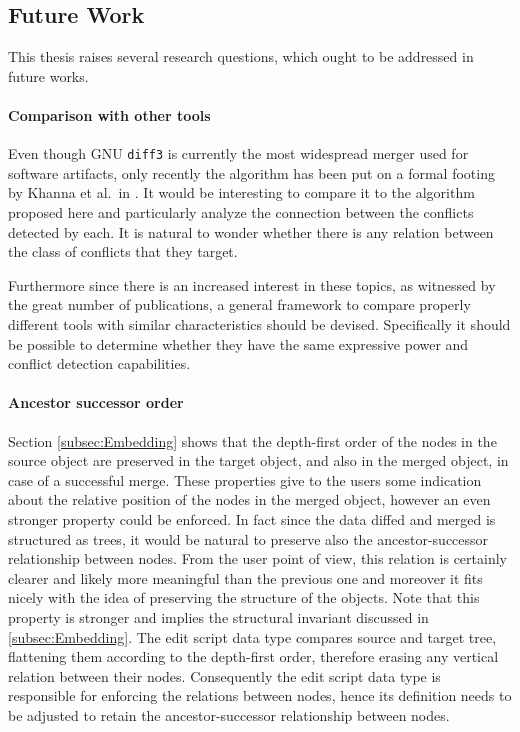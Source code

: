 \documentclass[../Thesis.tex]{subfiles}
\begin{document}
	
	\subsection{Future Work}	
	This thesis raises several research questions, which ought to be 
	addressed in future works.
	
	\paragraph{Comparison with other tools}
	Even though GNU \texttt{diff3} is currently the most widespread merger 
	used for software artifacts, only recently the algorithm has been put on a 
	formal footing by Khanna et al.\ in \cite{PierceDiff3}.
	It would be interesting to compare it to the algorithm proposed here
	and particularly analyze the connection between the conflicts detected
	by each. It is natural to wonder whether there is any relation between
	the class of conflicts that they target. 
	
	Furthermore since there is an increased interest in these topics, as 
	witnessed by the great number of publications, a general framework
	to compare properly different tools with similar characteristics 
	should be devised. Specifically it should be possible 
	to determine whether they have the same expressive power and
	conflict detection capabilities.
	
	\paragraph{Ancestor successor order}		
	Section \ref{subsec:Embedding} shows that the depth-first order
	of the nodes in the source object are preserved in the target object,
	and also in the merged object, in case of a successful merge.
	These properties give to the users some indication about the relative
	position of the nodes in the merged object, however an even stronger
	property could be enforced. In fact since the data diffed and merged is 
	structured as trees, it would be natural to preserve also the 
	ancestor-successor relationship between nodes.
	From the user point of view, this relation is certainly clearer and likely 
	more meaningful than the previous one and moreover it fits nicely
	with the idea of preserving the structure of the objects.
	Note that this property is stronger and implies the structural invariant
	discussed in \ref{subsec:Embedding}.
	The edit script data type compares source and target tree, flattening
	them according to the depth-first order, therefore erasing any
	vertical relation between their nodes. 
	Consequently the edit script data type is responsible
	for enforcing the relations between nodes, hence its definition 
	needs to be	adjusted to retain the ancestor-successor relationship
	between nodes. 
	
\end{document}
